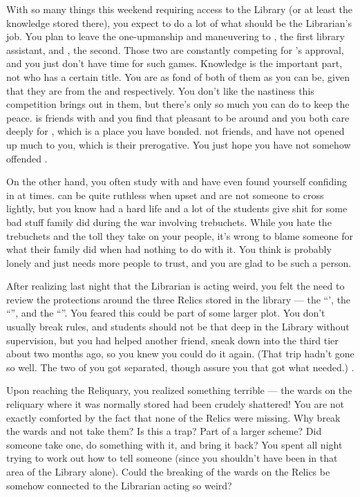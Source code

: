 \documentclass[char]{GL2020}
\begin{document}
With so many things this weekend requiring access to the Library (or at least the knowledge stored there), you expect to do a lot of what should be the Librarian’s job. You plan to leave the one-upmanship and maneuvering to \cAmbition{\full}, the first library assistant, and \cLibAssist{\full}, the second. Those two are constantly competing for \cLibrarian{}’s approval, and you just don’t have time for such games. Knowledge is the important part, not who has a certain title. You are as fond of both of them as you can be, given that they are from the \pTech{} and \pFarm{} respectively. You don't like the nastiness this competition brings out in them, but there's only so much you can do to keep the peace. \cAmbition{} is friends with \cHeir{} and you find that \cAmbition{\theyare} pleasant to be around and you both care deeply for \cHeir{}, which is a place you have bonded. \cAmbition{\Theyare} not friends, and have not opened up much to you, which is their prerogative. You just hope you have not somehow offended \cAmbition{\them}.

On the other hand, you often study with \cLibAssist{} and have even found yourself confiding in \cLibAssist{\them} at times. \cLibAssist{\They} can be quite ruthless when upset and are not someone to cross lightly, but you know \cLibAssist{\they} \cLibAssist{\have} had a hard life and a lot of the students give \cLibAssist{\them} shit for some bad stuff \cLibAssist{\their} family did during the war involving trebuchets. While you hate the trebuchets and the toll they take on your people, it's wrong to blame someone for what their family did when \cLibAssist{\they} had nothing to do with it. You think \cLibAssist{} is probably lonely and just needs more people to trust, and you are glad to be such a person. 

After realizing last night that the Librarian is acting weird, you felt the need to review the protections around the three Relics stored in the library — the ``\iNet{}', the ``\iLariat{}'', and the ``\iScythe{}''. You feared this could be part of some larger plot. You don't usually break rules, and students should not be that deep in the Library without supervision, but you had helped another friend, \cChupStudent{\full} sneak down into the third tier about two months ago, so you knew you could do it again. (That trip hadn’t gone so well. The two of you got separated, though \cChupStudent{\they} assure\cChupStudent{\verbs} you that \cChupStudent{\they} got what \cChupStudent{\they} needed.) . 

Upon reaching the Reliquary, you realized something terrible — the wards on the reliquary where it was normally stored had been crudely shattered! You are not exactly comforted by the fact that none of the Relics were missing. Why break the wards and not take them? Is this a trap? Part of a larger scheme? Did someone take one, do something with it, and bring it back? You spent all night trying to work out how to tell someone (since you shouldn't have been in that area of the Library alone). Could the breaking of the wards on the Relics be somehow connected to the Librarian acting so weird?
\end{document}
